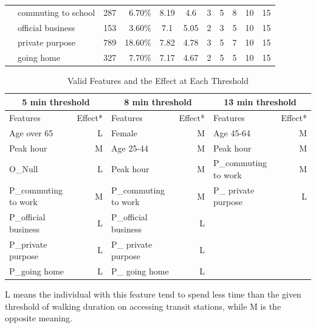 \documentclass[Journal,letterpaper]{ascelike-new}
\begin{document}
\begin{table}[htbp]
\begin{tabular}{llrrccccccc}
 & commuting to school & 287   &  6.70\% & 8.19  & 4.6   & 3     & 5     & 8     & 10    & 15 \\
 & official business   & 153   &  3.60\% & 7.1   & 5.05  & 2     & 3     & 5     & 10    & 15 \\
 & private purpose     & 789   & 18.60\% & 7.82  & 4.78  & 3     & 5     & 7     & 10    & 15 \\
 & going home          & 327   &  7.70\% & 7.17  & 4.67  & 2     & 5     & 5     & 10    & 15 \\
%
\hline\hline
\end{tabular}
\normalsize
\end{table}
%
\begin{table}[htbp]
\caption{Valid Features and the Effect at Each Threshold}
\label{table:2}
\centering
\small
\renewcommand{\arraystretch}{1.25}
\begin{tabular}{lrlrlr}
\hline\hline
\multicolumn{2}{c}{5 min threshold} & \multicolumn{2}{c}{8 min threshold} & \multicolumn{2}{c}{13 min threshold} \\
\hline
Features 	& Effect* 	& Features 	& Effect*		& Features 	& Effect* \\
Age over 65 			& L	& Female				& M	& Age 45-64				& M	\\
Peak hour				& M	& Age 25-44 			& M	& Peak hour 			& M	\\
O\_Null					& L	& Peak hour				& M	& P\_commuting to work 	& M \\
P\_commuting to work	& M	& P\_commuting to work  & M	& P\_ private purpose 	& L \\
P\_official business	& L & P\_official business	& L	&       				&  	\\
P\_private purpose		& L & P\_ private purpose	& L &       				&  	\\
P\_going home 			& L & P\_ going home 		& L &       				&   \\
\hline\hline
\end{tabular}
\normalsize
%
\begin{description}
\label{note:1}
\item[*Note:]
L means the individual with this feature tend to spend less time than the given threshold of walking duration on accessing transit stations, while M is the opposite meaning.
\end{description}
\end{table}
%
\end{document}
